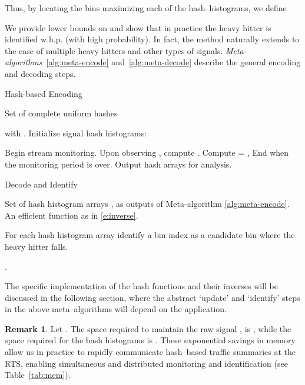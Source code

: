 \documentclass[10pt, conference, letterpaper,onecolumn]{IEEEtranv1.8}
\theoremstyle{plain}\newtheorem{thm}{Theorem}\newtheorem{lem}{Lemma}
\theoremstyle{definition}
\newtheorem{rem}{Remark}
\begin{document}
Thus, by locating the bins  maximizing each of the  hash--histograms, we define

We provide lower bounds on  and show that
in practice the heavy hitter is identified w.h.p. (with high probability).
In fact, the method naturally extends to the case of multiple heavy hitters and other 
types of signals. {\em Meta-algorithms}~\ref{alg:meta-encode} and~\ref{alg:meta-decode} 
describe the general encoding  and decoding steps. 

\renewcommand{\thealgorithm}{\roman{algorithm}}

\begin{algorithm}[t]
\caption{Hash-based Encoding}
\label{alg:meta-encode}
\begin{algorithmic}[1]
\REQUIRE Set of complete uniform hashes 
 
 with . Initialize signal hash histograms: 
 

\STATE [Start] Begin stream monitoring.
 Upon observing , compute .
\STATE [Update] Compute  = ,  
\STATE [Stop] End when the monitoring period is over.
\RETURN Output hash arrays  for analysis.
\end{algorithmic}
\end{algorithm}

\begin{algorithm}[t]
\caption{Decode and Identify}
\label{alg:meta-decode}
\begin{algorithmic}[1]
\REQUIRE Set of hash histogram arrays , as outputs of
Meta-algorithm \ref{alg:meta-encode}. An efficient  function as in \eqref{e:inverse}.

\STATE [Identify] For each hash histogram array  identify a bin index  as a
candidate bin where the heavy hitter falls.
 
\RETURN .
\end{algorithmic}
\end{algorithm}


\renewcommand{\thealgorithm}{\arabic{algorithm}}

The specific implementation of the hash functions and their inverses will be discussed in the following section, where
the abstract {\rm `update'} and {\rm `identify'} steps in the above meta--algorithms will depend on the application. 


\begin{rem} Let . The space required to maintain the raw signal , is
, while the space required for the hash histograms  is . These
exponential savings in memory allow us in practice to rapidly communicate hash--based traffic summaries at the RTS, 
enabling simultaneous and distributed monitoring and identification (see Table~\ref{tab:mem}).
\end{rem}
\end{document}

